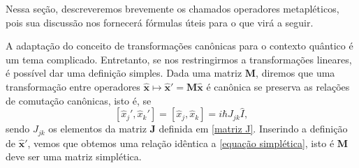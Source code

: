 \documentclass[
	12pt,
	oneside,			%
	a4paper,			%
	english,			%
	brazil				%
	]{abntex2}
\theoremstyle{definition}
\begin{document}
Nessa seção, descreveremos brevemente os chamados operadores metapléticos, pois sua discussão nos fornecerá fórmulas úteis para o que virá a seguir.

A adaptação do conceito de transformações canônicas para o contexto quântico é um tema complicado. Entretanto, se nos restringirmos a transformações lineares, é possível dar uma definição simples. Dada uma matriz $\mathbf{M}$, diremos que uma transformação entre operadores $\hat{\mathbf{x}} \mapsto \hat{\mathbf{x}}' = \mathbf{M} \hat{\mathbf{x}}$ é canônica se preserva as relações de comutação canônicas, isto é, se
\begin{equation}
\label{preservação relações de comutação}
    \left[ \hat{x}_j', \hat{x}_k' \right] = \left[ \hat{x}_j, \hat{x}_k \right] = i \hbar J_{jk} \hat{I},
\end{equation}
sendo $J_{jk}$ os elementos da matriz $\mathbf{J}$ definida em \eqref{matriz J}. Inserindo a definição de $\hat{\mathbf{x}}'$, vemos que obtemos uma relação idêntica a \eqref{equação simplética}, isto é $\mathbf{M}$ deve ser uma matriz simplética.
\end{document}
